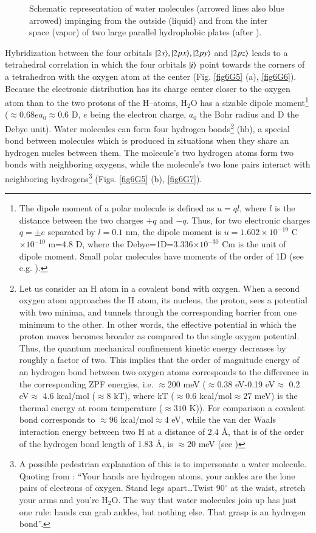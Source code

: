 \begin{subappendices}
\begin{figure}
\caption{Schematic representation of water molecules (arrowed lines also blue arrowed) impinging from the outside (liquid) and from the inter space (vapor) of two large parallel hydrophobic plates (after \cite{Lum:99}).}\label{fig6G8}
\end{figure}
Hybridization between the four orbitals $|{2s} \rangle,|{2px} \rangle,|{2py} \rangle$ and $|{2pz} \rangle$ leads to a tetrahedral correlation in which the four orbitals $|{i} \rangle$ point towards the corners of a tetrahedron with the oxygen atom at the center (Fig. \ref{fig6G5} (a), \ref{fig6G6}). Because the electronic distribution has its charge center closer to the oxygen atom than to the two protons of the H--atoms, H$_2$O has a sizable dipole moment\footnote{The dipole moment of a polar molecule is defined as $u=ql$, where $l$ is the distance between the two charges $+q$ and $-q$. Thus, for two electronic charges $q=\pm e$ separated by $l=0.1$ nm, the dipole moment is $u=1.602\times 10^{-19}$ C$\times10^{-10}$ m=4.8 D, where the Debye=1D=3.336$\times10^{-30}$ Cm is the unit of dipole moment. Small polar molecules have moments of the order of 1D (see e.g. \cite{Israelachvili:85}). } ($\approx 0.68 ea_0\approx0.6$ D, $e$ being the electron charge, $a_0$ the Bohr radius and D the Debye unit). Water molecules can form four hydrogen bonds\footnote{Let us consider an H atom in a covalent bond with oxygen. When a second oxygen atom approaches the H atom, its nucleus, the proton, sees a potential with two minima, and tunnels through the corresponding barrier from one minimum to the other. In other words, the effective potential in which the proton moves becomes broader as compared to the single oxygen potential. Thus, the quantum mechanical confinement kinetic energy decreases by roughly a factor of two. This implies that the order of magnitude energy of an hydrogen bond between two oxygen atoms corresponds to the difference in the corresponding ZPF energies, i.e. $\approx200$ meV ($\approx 0.38$ eV-0.19 eV$\approx$ 0.2 eV$\approx$ 4.6 kcal/mol ($\approx8$ kT), where kT ($\approx0.6$ kcal/mol$\approx27$ meV) is the thermal energy at room temperature ($\approx310$ K)). For comparison a covalent  bond corresponds to $\approx96$ kcal/mol$\approx4$ eV, while the van der Waals interaction energy between two H at a distance of 2.4 \AA, that is of the order of the hydrogen bond length of 1.83 \AA,  is $\approx20$ meV (see \cite{Povh:02})} (hb), a special bond between molecules which is produced in situations when they share an hydrogen nucles between them. The molecule's two hydrogen atoms form two bonds with neighboring oxygens, while the molecule's two lone pairs interact with neighboring hydrogens\footnote{A possible pedestrian explanation of this is to impersonate a water molecule. Quoting from \cite{Ball:03}: ``Your hands are hydrogen atoms, your ankles are the lone pairs of electrons of oxygen. Stand legs apart\dots Twist 90$^\circ$ at the waist, stretch your arms and you're H$_2$O. The way that water molecules join up has just one rule: hands can grab ankles, but nothing else. That grasp is an hydrogen bond''.} (Figs. \ref{fig6G5} (b), \ref{fig6G7}). 



\end{subappendices}
